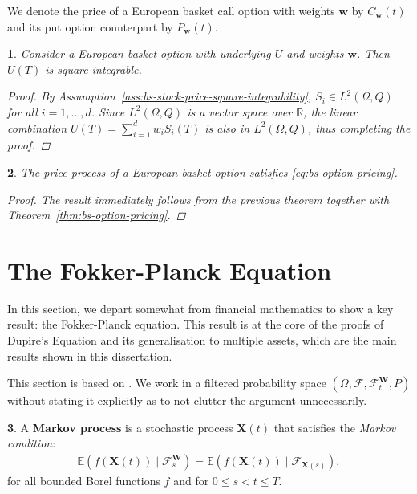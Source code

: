 \documentclass[english]{article}
\numberwithin{equation}{section}
\numberwithin{figure}{section}
\theoremstyle{bolddescit}
\newtheorem{theorem}{\protect\theoremname}[section]
\theoremstyle{definition}
\newtheorem{definition}[theorem]{\protect\definitionname}
\theoremstyle{definition}
\theoremstyle{plain}
\theoremstyle{plain}
\newtheorem{corollary}[theorem]{\protect\corollaryname}
\theoremstyle{bolddesc}
\theoremstyle{plain}
\theoremstyle{remark}
\providecommand{\corollaryname}{Corollary}
\providecommand{\definitionname}{Definition}
\providecommand{\theoremname}{Theorem}
\begin{document}
We denote the price of a European basket call option with weights $\mathbf{w}$ by $C_\mathbf{w}(t)$ and its put option counterpart by $P_\mathbf{w}(t)$.

\begin{theorem}
  Consider a European basket option with underlying $U$ and weights $\mathbf{w}$. Then $U(T)$ is square-integrable.

  \begin{proof}
    By Assumption~\ref{ass:bs-stock-price-square-integrability}, $S_i \in L^2(\Omega, Q)$ for all $i=1,\ldots,d$. Since $L^2(\Omega, Q)$ is a vector space over $\mathbb{R}$, the linear combination $U(T) = \sum_{i=1}^{d} w_i S_i(T)$ is also in $L^2(\Omega, Q)$, thus completing the proof.
  \end{proof}
\end{theorem}

\begin{corollary}
  The price process of a European basket option satisfies \eqref{eq:bs-option-pricing}.

  \begin{proof}
    The result immediately follows from the previous theorem together with Theorem~\ref{thm:bs-option-pricing}.
  \end{proof}
\end{corollary}

\section{The Fokker-Planck Equation}\label{sec:fokker-planck}


In this section, we depart somewhat from financial mathematics to show a key result: the Fokker-Planck equation. This result is at the core of the proofs of Dupire's Equation and its generalisation to multiple assets, which are the main results shown in this dissertation.

This section is based on \textcite{pavliotis_stochastic_2014}. We work in a filtered probability space $(\Omega, \mathcal{F}, \mathcal{F}^\mathbf{W}_t, P)$ without stating it explicitly as to not clutter the argument unnecessarily.

\begin{definition}
  A \textbf{Markov process} is a stochastic process $\mathbf{X}(t)$ that satisfies the \textit{Markov condition}:
  \begin{align*}
    \mathbb{E}(f(\mathbf{X}(t)) \mid \mathcal{F}^\mathbf{W}_{s})
    = \mathbb{E}(f(\mathbf{X}(t)) \mid \mathcal{F}_{\mathbf{X}(s)}),
  \end{align*}
  for all bounded Borel functions $f$ and for $0 \le s < t \le T$.
\end{definition}
\end{document}
